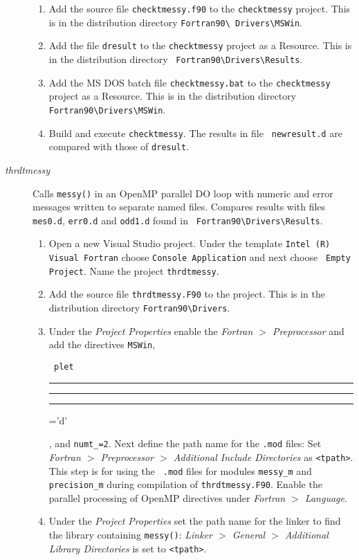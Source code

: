 \documentclass[12pt]{article}
\DeclareRobustCommand{\us}{\rule{.2pt}{0pt}\rule[-.8pt]{.4em}{.5pt}%
  \rule{.2pt}{0pt}}
\DeclareRobustCommand{\us}{\rule{.2pt}{0pt}\rule[-.8pt]{.4em}{.5pt}%
  \rule{.2pt}{0pt}}
\begin{document}
\begin{description}
\begin{enumerate}
  \item Add the source file {\tt checktmessy.f90} to the {\tt checktmessy}
    project.  This is in the distribution directory {\tt Fortran90\textbackslash
      Drivers\textbackslash MSWin}.

  \item Add the file {\tt dresult} to the {\tt checktmessy} project as a
    Resource.  This is in the distribution directory {\tt
      Fortran90\textbackslash Drivers\textbackslash Results}.

  \item Add the MS DOS batch file {\tt checktmessy.bat} to the {\tt checktmessy}
    project as a Resource.  This is in the distribution directory {\tt
      Fortran90\textbackslash Drivers\textbackslash MSWin}.
  \item Build and execute {\tt checktmessy}.  The results in file {\tt
      newresult.d} are compared with those of {\tt dresult}.
  \end {enumerate}
\item[{\em thrdtmessy}] Calls {\tt messy()} in an OpenMP parallel DO loop with
  numeric and error messages written to separate named files.  Compares results
  with files {\tt mes0.d}, {\tt err0.d} and {\tt odd1.d} found in {\tt
    Fortran90\textbackslash Drivers\textbackslash Results}.
  \begin{enumerate}
  \item Open a new Visual Studio project.  Under the template {\tt Intel (R)
      Visual Fortran} choose {\tt Console Application} and next choose {\tt
      Empty Project}.  Name the project {\tt thrdtmessy}.
  \item Add the source file {\tt thrdtmessy.F90} to the project.  This is in the
    distribution directory {\tt Fortran90\textbackslash Drivers}.
  \item Under the {\em Project Properties} enable the {\em Fortran $>$
      Preprocessor} and add the directives {\tt MSWin}, {\tt
      plet\us=\rq{}d\rq{}}, and {\tt numt\_=2}.  Next define the path name for
    the {\tt .mod} files: Set {\em Fortran $>$ Preprocessor $>$ Additional
      Include Directories} as {\tt <tpath>}.  This step is for using the {\tt
      .mod} files for modules {\tt messy\_m} and {\tt precision\_m} during
    compilation of {\tt thrdtmessy.F90}.  Enable the parallel processing of
    OpenMP directives under {\em Fortran $>$ Language}.
  \item Under the {\em Project Properties} set the path name for the linker to
    find the library containing {\tt messy()}: {\em Linker $>$ General $>$
      Additional Library Directories} is set to {\tt <tpath>}.


\end{enumerate}
\end{description}
\end{document}

